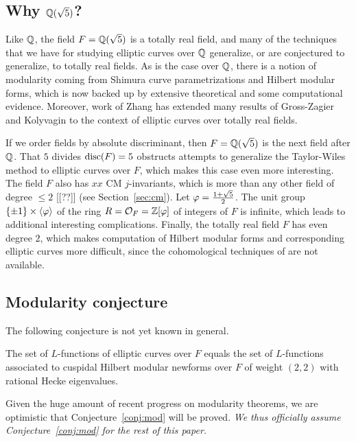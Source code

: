 \documentclass{amsart}
\begin{document}
\subsection{Why $\mathbb{Q}(\sqrt{5})$?}

Like $\mathbb{Q}$, the field $F=\mathbb{Q}(\sqrt{5})$ is a totally real field, and
many of the techniques that we have for studying elliptic curves over
$\mathbb{Q}$ generalize, or are conjectured to generalize, to totally real
fields.
As is the case over $\mathbb{Q}$, there is a 
notion of modularity coming from Shimura curve
parametrizations and Hilbert modular forms, which is now backed up by
extensive theoretical \cite{} and some computational \cite{} evidence.
Moreover,  work \cite{zhang:heightsshimura} of Zhang has extended many results
of Gross-Zagier \cite{gross-zagier} and Kolyvagin \cite{gross:kolyvagin} 
to the context of elliptic curves over totally real fields.

If we order fields by absolute discriminant, then $F=\mathbb{Q}(\sqrt{5})$ is
the next field after $\mathbb{Q}$.  That $5$ divides $\operatorname{disc}(F)=5$ obstructs
attempts to generalize the Taylor-Wiles method to elliptic curves over
$F$, which makes this case even more interesting.  The field $F$ also
has $xx$ CM $j$-invariants, which is more than any other field of
degree $\leq 2$ [[??]] (see Section~\ref{sec:cm}).  Let
$\varphi=\frac{1+\sqrt{5}}{2}$.  The unit group $\{\pm 1\} \times
\langle \varphi \rangle$ of the ring $R=\mathcal{O}_F=\mathbb{Z}[\varphi]$ of integers of
$F$ is infinite, which leads to additional interesting complications.
Finally, the totally real field $F$ has even degree $2$, which makes
computation of Hilbert modular forms and corresponding elliptic curves
more difficult, since the cohomological techniques of \cite{} are not
available.  


\subsection{Modularity conjecture}\label{sec:mod}
The following conjecture is not yet known in general. 
\begin{conjecture}[Modularity]\label{conj:mod}
  The set of $L$-functions of elliptic curves over $F$ equals the set
  of $L$-functions associated to cuspidal Hilbert modular newforms
  over $F$ of weight $(2,2)$ with rational Hecke eigenvalues.
\end{conjecture}
Given the huge amount of recent progress on modularity theorems, we
are optimistic that Conjecture~\ref{conj:mod} will be proved.  {\em We thus
officially assume Conjecture~\ref{conj:mod}  for the rest of this paper.}
\end{document}
